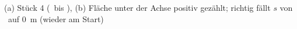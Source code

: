 (a) Stück 4 (\tThreeO\ bis \tEO), (b) Fläche unter der Achse positiv gezählt; richtig fällt $s$ von \sThreeO\ auf \SI{0}{\meter} (wieder am Start)
